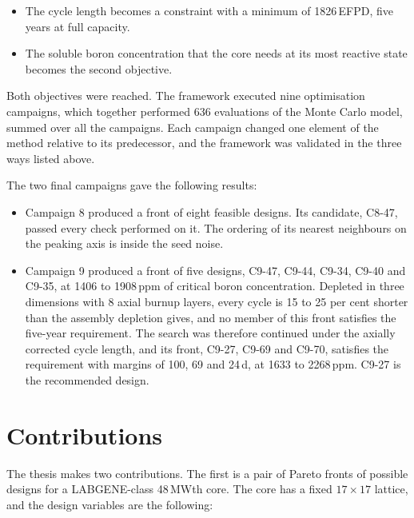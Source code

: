 \begin{itemize}
  \item The cycle length becomes a constraint with a minimum of 1826\,EFPD,
five years at full capacity.

  \item The soluble boron concentration that the core needs at its most
        reactive state becomes the second objective.
\end{itemize}

Both objectives were reached. The framework executed nine optimisation campaigns, which together performed
636 evaluations of the Monte Carlo model, summed over all the campaigns.
Each campaign changed one element of the method relative to its
predecessor, and the framework was validated in the three ways listed
above.

The two final campaigns gave the following results:

\begin{itemize}
  \item Campaign 8 produced a front of eight feasible designs. Its
        candidate, C8-47, passed every check performed on it.
        The ordering of its nearest neighbours on the peaking axis is
        inside the seed noise.

    \item Campaign 9 produced a front of five designs, C9-47, C9-44,
        C9-34, C9-40 and C9-35, at 1406 to 1908\,ppm of critical boron
        concentration. Depleted in three dimensions with 8 axial burnup
        layers, every cycle is 15 to 25 per cent shorter than the
        assembly depletion gives, and no member of this front satisfies
        the five-year requirement. The search was therefore continued
        under the axially corrected cycle length, and its front, C9-27,
        C9-69 and C9-70, satisfies the requirement with margins of 100,
        69 and 24\,d, at 1633 to 2268\,ppm. C9-27 is the recommended
        design.
\end{itemize}

\section{Contributions}
\label{sec:intro-contributions}

The thesis makes two contributions. The first is a pair of Pareto fronts of possible designs for a
LABGENE-class 48\,MWth core. The core has a fixed $17\times17$ lattice,
and the design variables are the following:

